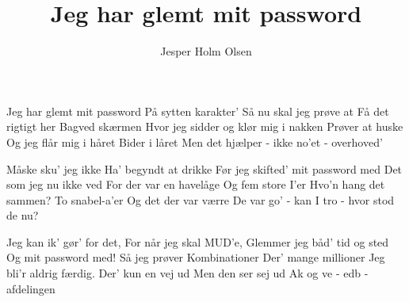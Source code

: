 \documentclass[11pt,a4paper]{article}
\title{Jeg har glemt mit password}
\author{Jesper Holm Olsen}
\begin{document}
\maketitle

\begin{song}
Jeg har glemt mit password
På sytten karakter'
Så nu skal jeg prøve at
Få det rigtigt her
Bagved skærmen
Hvor jeg sidder og klør mig i nakken
Prøver at huske
Og jeg flår mig i håret
Bider i låret
Men det hjælper - ikke no'et - overhoved'

Måske sku' jeg ikke 
Ha' begyndt at drikke
Før jeg skifted' mit password med
Det som jeg nu ikke ved
For der var en havelåge 
Og fem store I'er
Hvo'n hang det sammen?
To snabel-a'er
Og det der var værre
De var go' - kan I tro - hvor stod de nu?

Jeg kan ik' gør' for det, 
For når jeg skal MUD'e,
Glemmer jeg båd' tid og sted
Og mit password med!
Så jeg prøver
Kombinationer
Der' mange millioner
Jeg bli'r aldrig færdig.
Der' kun en vej ud
Men den ser sej ud
Ak og ve - edb - afdelingen
\end{song}
\end{document}
